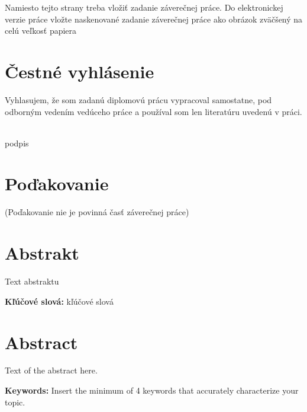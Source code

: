 \newpage %
\thispagestyle{empty}
\begingroup
\begin{LARGE}
	Namiesto tejto strany treba vložiť zadanie záverečnej práce.
	Do elektronickej verzie práce vložte naskenované zadanie záverečnej práce ako obrázok zväčšený na celú veľkosť papiera
\end{LARGE}
\endgroup

\newpage %
\pagestyle{fancy}
\mbox{}
\vfill
\section*{Čestné vyhlásenie}
Vyhlasujem, že som zadanú diplomovú prácu vypracoval samostatne, pod \nobreak odborným vedením vedúceho práce a používal som len literatúru uvedenú v práci.
\vspace*{0.25cm}
\\\mesto\ \datumodovzdania\ \rokodovzdania

\vspace*{.5cm}
\null\hfill podpis

\newpage %
\mbox{}
\vfill
\section*{Poďakovanie}
(Poďakovanie nie je povinná časť záverečnej práce)
\vspace{3cm}

\newpage %
\section*{Abstrakt}

Text abstraktu

\vspace{0.5cm}
\noindent\textbf{Kľúčové slová:} kľúčové slová \\

\section*{Abstract}

Text of the abstract here.

\vspace{0.5cm}
\noindent\textbf{Keywords:} Insert the minimum of 4 keywords that accurately characterize your topic.
